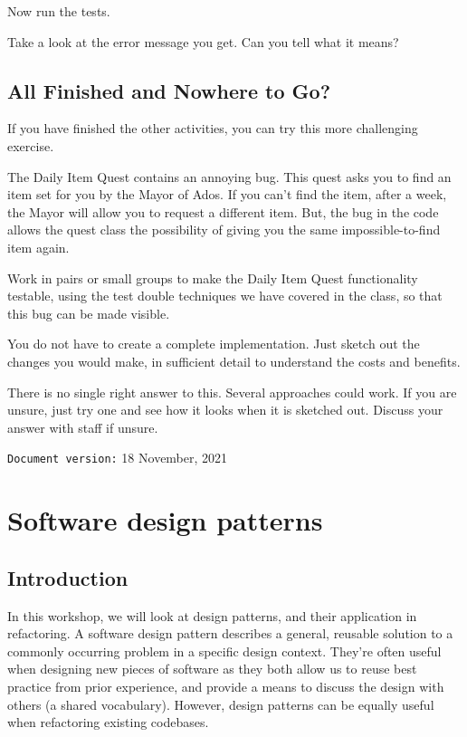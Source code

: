 \documentclass[
]{book}
\begin{document}
Now run the tests.

Take a look at the error message you get. Can you tell what it means?

\hypertarget{next}{%
\section{All Finished and Nowhere to Go?}\label{next}}

If you have finished the other activities, you can try this more challenging exercise.

The Daily Item Quest contains an annoying bug. This quest asks you to find an item set for you by the Mayor of Ados. If you can't find the item, after a week, the Mayor will allow you to request a different item. But, the bug in the code allows the quest class the possibility of giving you the same impossible-to-find item again.

Work in pairs or small groups to make the Daily Item Quest functionality testable, using the test double techniques we have covered in the class, so that this bug can be made visible.

You do not have to create a complete implementation. Just sketch out the changes you would make, in sufficient detail to understand the costs and benefits.

There is no single right answer to this. Several approaches could work. If you are unsure, just try one and see how it looks when it is sketched out. Discuss your answer with staff if unsure.

\texttt{Document\ version:} 18 November, 2021

\hypertarget{patterning}{%
\chapter{Software design patterns}\label{patterning}}

\hypertarget{introduction}{%
\section{Introduction}\label{introduction}}

In this workshop, we will look at design patterns, and their application in refactoring. A software design pattern describes a general, reusable solution to a commonly occurring problem in a specific design context. They're often useful when designing new pieces of software as they both allow us to reuse best practice from prior experience, and provide a means to discuss the design with others (a shared vocabulary). However, design patterns can be equally useful when refactoring existing codebases.
\end{document}
